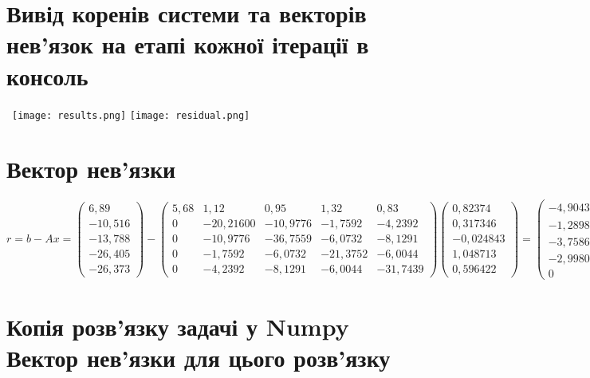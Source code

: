 \documentclass{report}
\begin{document}
\section*{Вивід коренів системи та векторів нев'язок на етапі кожної ітерації в консоль}\
\texttt{[image: results.png]}
\texttt{[image: residual.png]}


\section*{Вектор нев’язки}
$r = b - Ax = 
\begin{pmatrix}
6,89\\
-10,516\\
-13,788\\
-26,405\\
-26,373
\end{pmatrix} - \begin{pmatrix}
5,68 & 1,12 & 0,95 & 1,32 & 0,83\\
0 & -20,21600 & -10,9776 & -1,7592 & -4,2392\\
0 & -10,9776 & -36,7559 & -6,0732 & -8,1291\\
0 & -1,7592 & -6,0732 & -21,3752 & -6,0044\\
0 & -4,2392 & -8,1291 & -6,0044 & -31,7439
\end{pmatrix}\begin{pmatrix}
0,82374\\
0,317346\\
-0,024843\\
1,048713\\
0,596422
\end{pmatrix} = \begin{pmatrix}
-4,904359e^{-8}\\
-1,289813e^{-7}\\
-3,758611e^{-9}\\
-2,998069e^{-8}\\
0
\end{pmatrix}$


\section*{Копія розв’язку задачі у Numpy\\Вектор нев’язки для цього розв’язку}

\end{document}
